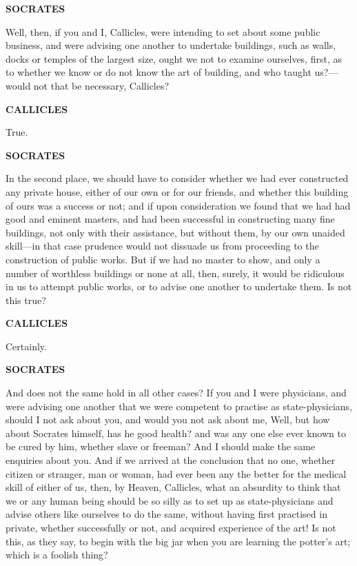\documentclass[11pt,letter]{article}
\begin{document}
\par \textbf{SOCRATES}
\par   Well, then, if you and I, Callicles, were intending to set about some public business, and were advising one another to undertake buildings, such as walls, docks or temples of the largest size, ought we not to examine ourselves, first, as to whether we know or do not know the art of building, and who taught us?—would not that be necessary, Callicles?

\par \textbf{CALLICLES}
\par   True.

\par \textbf{SOCRATES}
\par   In the second place, we should have to consider whether we had ever constructed any private house, either of our own or for our friends, and whether this building of ours was a success or not; and if upon consideration we found that we had had good and eminent masters, and had been successful in constructing many fine buildings, not only with their assistance, but without them, by our own unaided skill—in that case prudence would not dissuade us from proceeding to the construction of public works. But if we had no master to show, and only a number of worthless buildings or none at all, then, surely, it would be ridiculous in us to attempt public works, or to advise one another to undertake them. Is not this true?

\par \textbf{CALLICLES}
\par   Certainly.

\par \textbf{SOCRATES}
\par   And does not the same hold in all other cases? If you and I were physicians, and were advising one another that we were competent to practise as state-physicians, should I not ask about you, and would you not ask about me, Well, but how about Socrates himself, has he good health? and was any one else ever known to be cured by him, whether slave or freeman? And I should make the same enquiries about you. And if we arrived at the conclusion that no one, whether citizen or stranger, man or woman, had ever been any the better for the medical skill of either of us, then, by Heaven, Callicles, what an absurdity to think that we or any human being should be so silly as to set up as state-physicians and advise others like ourselves to do the same, without having first practised in private, whether successfully or not, and acquired experience of the art! Is not this, as they say, to begin with the big jar when you are learning the potter’s art; which is a foolish thing?
\end{document}
